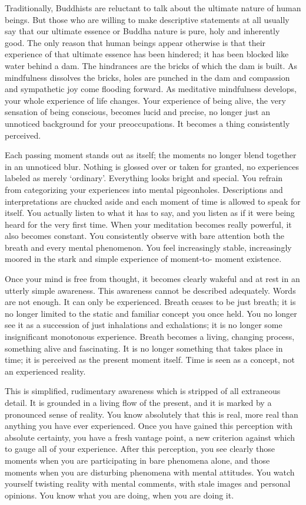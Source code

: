 Traditionally, Buddhists are reluctant to talk about the ultimate nature of
human beings. But those who are willing to make descriptive statements at all
usually say that our ultimate essence or Buddha nature is pure, holy and
inherently good. The only reason that human beings appear otherwise is that
their experience of that ultimate essence has been hindered; it has been blocked
like water behind a dam. The hindrances are the bricks of which the dam is
built. As mindfulness dissolves the bricks, holes are punched in the dam and
compassion and sympathetic joy come flooding forward. As meditative mindfulness
develops, your whole experience of life changes. Your experience of being alive,
the very sensation of being conscious, becomes lucid and precise, no longer just
an unnoticed background for your preoccupations. It becomes a thing consistently
perceived.

Each passing moment stands out as itself; the moments no longer blend together
in an unnoticed blur. Nothing is glossed over or taken for granted, no
experiences labeled as merely `ordinary'. Everything looks bright and special.
You refrain from categorizing your experiences into mental pigeonholes.
Descriptions and interpretations are chucked aside and each moment of time is
allowed to speak for itself. You actually listen to what it has to say, and you
listen as if it were being heard for the very first time. When your meditation
becomes really powerful, it also becomes constant. You consistently observe with
bare attention both the breath and every mental phenomenon. You feel
increasingly stable, increasingly moored in the stark and simple experience of
moment-to- moment existence.

Once your mind is free from thought, it becomes clearly wakeful and at rest in
an utterly simple awareness. This awareness cannot be described adequately.
Words are not enough. It can only be experienced. Breath ceases to be just
breath; it is no longer limited to the static and familiar concept you once
held. You no longer see it as a succession of just inhalations and exhalations;
it is no longer some insignificant monotonous experience. Breath becomes a
living, changing process, something alive and fascinating. It is no longer
something that takes place in time; it is perceived as the present moment
itself. Time is seen as a concept, not an experienced reality.

This is simplified, rudimentary awareness which is stripped of all extraneous
detail. It is grounded in a living flow of the present, and it is marked by a
pronounced sense of reality. You know absolutely that this is real, more real
than anything you have ever experienced. Once you have gained this perception
with absolute certainty, you have a fresh vantage point, a new criterion against
which to gauge all of your experience. After this perception, you see clearly
those moments when you are participating in bare phenomena alone, and those
moments when you are disturbing phenomena with mental attitudes. You watch
yourself twisting reality with mental comments, with stale images and personal
opinions. You know what you are doing, when you are doing it.

